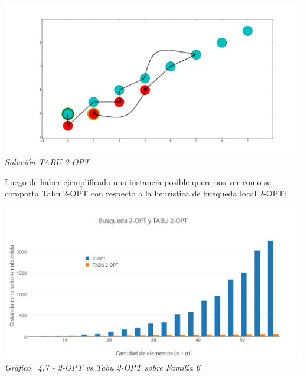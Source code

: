 \vspace*{0.3cm} \vspace*{0.3cm}
  \begin{center}
 \includegraphics[scale=0.3]{./EJ4/fam63opt.png}\\
 {            \textit{Soluci\'on TABU 3-OPT}}
  \end{center}
  \vspace*{0.3cm}

Luego de haber ejemplificado una instancia posible queremos ver como se comporta Tabu 2-OPT con respecto a la heur\'istica de busqueda local 2-OPT:

\vspace*{0.3cm} \vspace*{0.3cm}
  \begin{center}
 \includegraphics[scale=0.5]{./EJ4/comparativosinorden2opt.png}\\
 {            \textit{Gráfico \ 4.7 - 2-OPT vs Tabu 2-OPT sobre Familia 6}}
  \end{center}
  \vspace*{0.3cm}

